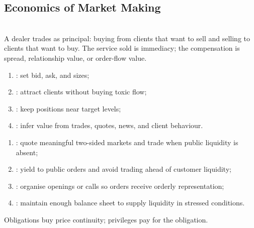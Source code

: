 \subsection{Economics of Market Making}

\begin{definition} \\
A dealer trades as principal: buying from clients that want to sell and selling to clients that want to buy. The service sold is immediacy; the compensation is spread, relationship value, or order-flow value.
\end{definition}

\begin{taxonomy} 
\begin{enumerate}[label=\roman*.]
\setlength{\itemsep}{0pt}
\item {}: set bid, ask, and sizes;
\item {}: attract clients without buying toxic flow;
\item {}: keep positions near target levels;
\item {}: infer value from trades, quotes, news, and client behaviour.
\end{enumerate}
\end{taxonomy}

\begin{taxonomy} 
\begin{enumerate}[label=\roman*.]
\setlength{\itemsep}{0pt}
\item {}: quote meaningful two-sided markets and trade when public liquidity is absent;
\item {}: yield to public orders and avoid trading ahead of customer liquidity;
\item {}: organise openings or calls so orders receive orderly representation;
\item {}: maintain enough balance sheet to supply liquidity in stressed conditions.
\end{enumerate}
Obligations buy price continuity; privileges pay for the obligation.
\end{taxonomy}

